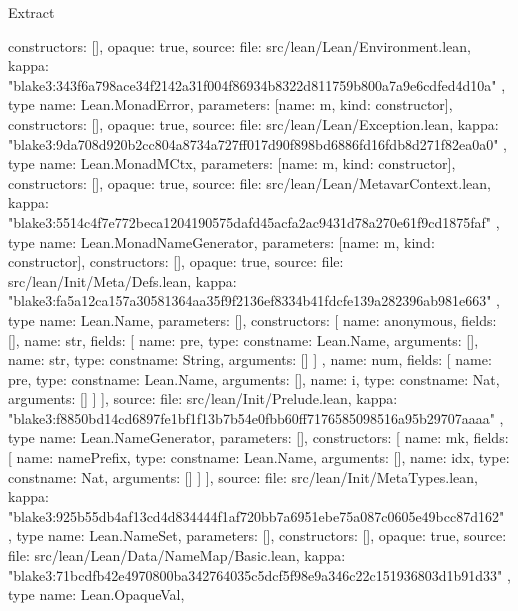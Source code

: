 \begin{lexlean}{Extract}
\begin{toolingmodule}
{{      constructors: [],
      opaque: true,
      source: {
        file: src/lean/Lean/Environment.lean,
        kappa: "blake3:343f6a798ace34f2142a31f004f86934b8322d811759b800a7a9e6cdfed4d10a"
      }
    },
    type{
      name: Lean.MonadError,
      parameters: [{name: m, kind: constructor{}}],
      constructors: [],
      opaque: true,
      source: {
        file: src/lean/Lean/Exception.lean,
        kappa: "blake3:9da708d920b2cc804a8734a727ff017d90f898bd6886fd16fdb8d271f82ea0a0"
      }
    },
    type{
      name: Lean.MonadMCtx,
      parameters: [{name: m, kind: constructor{}}],
      constructors: [],
      opaque: true,
      source: {
        file: src/lean/Lean/MetavarContext.lean,
        kappa: "blake3:5514c4f7e772beca1204190575dafd45acfa2ac9431d78a270e61f9cd1875faf"
      }
    },
    type{
      name: Lean.MonadNameGenerator,
      parameters: [{name: m, kind: constructor{}}],
      constructors: [],
      opaque: true,
      source: {
        file: src/lean/Init/Meta/Defs.lean,
        kappa: "blake3:fa5a12ca157a30581364aa35f9f2136ef8334b41fdcfe139a282396ab981e663"
      }
    },
    type{
      name: Lean.Name,
      parameters: [],
      constructors: [
        {name: anonymous, fields: []},
        {
          name: str,
          fields: [
            {name: pre, type: const{name: Lean.Name, arguments: []}},
            {name: str, type: const{name: String, arguments: []}}
          ]
        },
        {
          name: num,
          fields: [
            {name: pre, type: const{name: Lean.Name, arguments: []}},
            {name: i, type: const{name: Nat, arguments: []}}
          ]
        }
      ],
      source: {
        file: src/lean/Init/Prelude.lean,
        kappa: "blake3:f8850bd14cd6897fe1bf1f13b7b54e0fbb60ff7176585098516a95b29707aaaa"
      }
    },
    type{
      name: Lean.NameGenerator,
      parameters: [],
      constructors: [
        {
          name: mk,
          fields: [
            {name: namePrefix, type: const{name: Lean.Name, arguments: []}},
            {name: idx, type: const{name: Nat, arguments: []}}
          ]
        }
      ],
      source: {
        file: src/lean/Init/MetaTypes.lean,
        kappa: "blake3:925b55db4af13cd4d834444f1af720bb7a6951ebe75a087c0605e49bcc87d162"
      }
    },
    type{
      name: Lean.NameSet,
      parameters: [],
      constructors: [],
      opaque: true,
      source: {
        file: src/lean/Lean/Data/NameMap/Basic.lean,
        kappa: "blake3:71bcdfb42e4970800ba342764035c5dcf5f98e9a346c22c151936803d1b91d33"
      }
    },
    type{
      name: Lean.OpaqueVal,
}}
\end{toolingmodule}
\end{lexlean}
